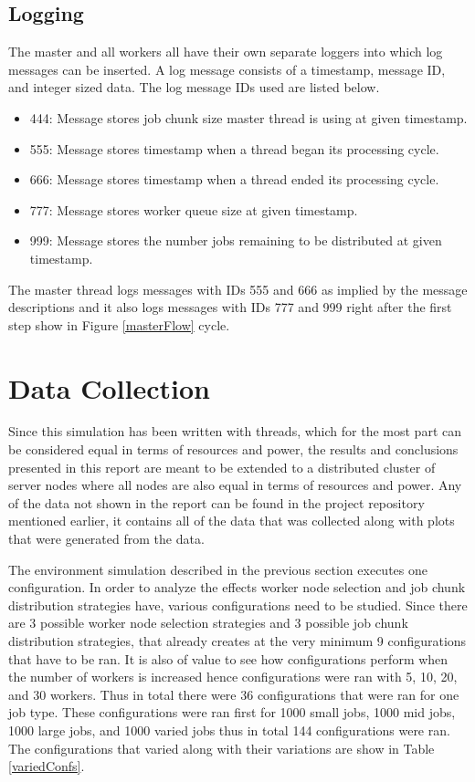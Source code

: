 \documentclass{article}
\begin{document}
\subsection{Logging}
The master and all workers all have their own separate loggers into which log messages can be inserted. A log message consists of a timestamp, message ID, and integer sized data. The log message IDs used are listed below.
\begin{itemize}
  \item 444: Message stores job chunk size master thread is using at given timestamp.
  \item 555: Message stores timestamp when a thread began its processing cycle.
  \item 666: Message stores timestamp when a thread ended its processing cycle.
  \item 777: Message stores worker queue size at given timestamp.
  \item 999: Message stores the number jobs remaining to be distributed at given timestamp.
\end{itemize}
The master thread logs messages with IDs 555 and 666 as implied by the message descriptions and it also logs messages with IDs 777 and 999 right after the first step show in Figure \ref{masterFlow} cycle.

\section{Data Collection} \label{dataCollection}
Since this simulation has been written with threads, which for the most part can be considered equal in terms of resources and power, the results and conclusions presented in this report are meant to be extended to a distributed cluster of server nodes where all nodes are also equal in terms of resources and power. Any of the data not shown in the report can be found in the project repository mentioned earlier, it contains all of the data that was collected along with plots that were generated from the data.

The environment simulation described in the previous section executes one configuration. In order to analyze the effects worker node selection and job chunk distribution strategies have, various configurations need to be studied. Since there are 3 possible worker node selection strategies and 3 possible job chunk distribution strategies, that already creates at the very minimum 9 configurations that have to be ran. It is also of value to see how configurations perform when the number of workers is increased hence configurations were ran with 5, 10, 20, and 30 workers. Thus in total there were 36 configurations that were ran for one job type. These configurations were ran first for 1000 small jobs, 1000 mid jobs, 1000 large jobs, and 1000 varied jobs thus in total 144 configurations were ran. The configurations that varied along with their variations are show in Table \ref{variedConfs}.
\end{document}
